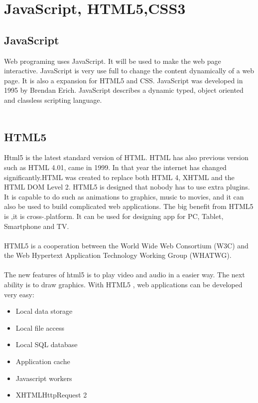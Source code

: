 \section{JavaScript, HTML5,CSS3}
 \subsection{JavaScript}
 Web programing uses JavaScript. It will be used to make the web page interactive. JavaScript is very use full to change the content dynamically of a web page. It is also a expansion for HTML5 and CSS. JavaScript was developed in 1995 by Brendan Erich. JavaScript describes a dynamic typed, object oriented and classless scripting language.\cite{javascript}
 \\\\
 \subsection{HTML5}
 Html5 is the latest standard version of HTML. HTML has also previous version such as HTML 4.01, came in 1999. In that year the internet has changed significantly.HTML was created to replace  both HTML 4, XHTML and the HTML DOM Level 2. HTML5 is designed that nobody has to use extra plugins. It is capable to do such as animations to graphics, music to movies, and it can also be used to build complicated web applications. The big benefit from HTML5 is ,it is cross-.platform. It can be used for designing app for PC, Tablet, Smartphone and TV.\\\\
 HTML5 is a cooperation between the World Wide Web Consortium (W3C) and the Web Hypertext Application Technology Working Group (WHATWG).\\\\
 
  The new features of html5 is to play video and audio in a easier way. The next ability is to draw graphics. With HTML5 , web applications can be developed very easy:\\
  \begin{itemize}
  \item Local data storage
  \item Local file access
  \item Local SQL database
  \item Application cache
  \item Javascript workers
  \item XHTMLHttpRequest 2
  
  \end{itemize}
  

